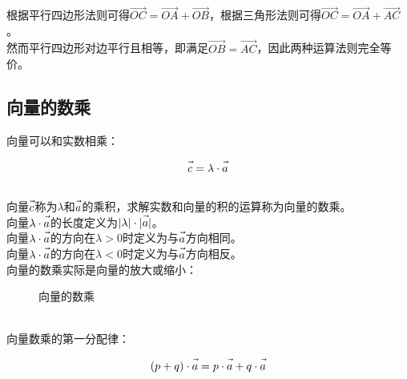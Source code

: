 \documentclass[UTF8]{ctexart}
\let\nvec\vec
\def\vec#1{\nvec{\vphantom b\smash{#1}}}
\begin{document}
    根据平行四边形法则可得$\overrightarrow{OC}=\overrightarrow{OA}+\overrightarrow{OB}$，根据三角形法则可得$\overrightarrow{OC}=\overrightarrow{OA}+\overrightarrow{AC}$。\\[3mm]
    然而平行四边形对边平行且相等，即满足$\overrightarrow{OB}=\overrightarrow{AC}$，因此两种运算法则完全等价。

\newpage

\subsection{向量的数乘}
    向量可以和实数相乘：
    \begin{large}
        \begin{equation*}
            \vec{c}=\lambda\cdot\vec{a}
        \end{equation*}
    \end{large}\\
    向量$\vec{c}$称为$\lambda$和$\vec{a}$的乘积，求解实数和向量的积的运算称为向量的数乘。\\[3mm]
    向量$\lambda\cdot\vec{a}$的长度定义为$|\lambda|\cdot|\vec{a}|$。\\[3mm]
    向量$\lambda\cdot\vec{a}$的方向在$\lambda>0$时定义为与$\vec{a}$方向相同。\\[3mm]
    向量$\lambda\cdot\vec{a}$的方向在$\lambda<0$时定义为与$\vec{a}$方向相反。\\[3mm]
    向量的数乘实际是向量的放大或缩小：
    \begin{figure}[h]
        \begin{center}
            \caption{向量的数乘}
        \end{center}
    \end{figure}\\
    向量数乘的第一分配律：
    \begin{large}
        \begin{equation*}
            (p+q)\cdot\vec{a}=p\cdot\vec{a}+q\cdot\vec{a}
        \end{equation*}
    \end{large}\\
\end{document}
